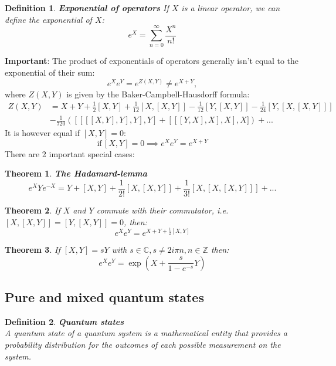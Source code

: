 \documentclass[12pt, a4paper,  nobibnotes]{article}
\newtheorem{theorem}{Theorem}
\newtheorem{definition}{Definition}
\begin{document}
\begin{definition}
    \textbf{Exponential of operators}
    If $X$ is a linear operator, we can define the exponential of $X$:
    \begin{equation*}
        e^X = \sum\limits_{n=0}^\infty \frac{X^n}{n!} 
    \end{equation*}
\end{definition}
\textbf{Important}:
The product of exponentials of operators generally isn't equal to the exponential of their sum:
\begin{equation*}
    e^{X}e^{Y} = e^{Z(X,Y)}\neq e^{X+Y},
\end{equation*}
where $Z(X,Y)$ is given by the Baker-Campbell-Hausdorff formula:
\begin{align*}
    Z(X,Y) &= X + Y + \frac{1}{2}[X,Y] + \frac{1}{12}[X,[X,Y]] - \frac{1}{12}[Y,[X,Y]] -\frac{1}{24}[Y,[X,[X,Y]]] \\
    & - \frac{1}{720}([[[[X,Y],Y],Y],Y] + [[[Y,X],X],X],X]) + ...
\end{align*}
It is however equal if $[X,Y]=0$:
\begin{equation*}
    \textrm{if}\,[X,Y]=0 \implies  e^{X}e^{Y} = e^{X+Y}
\end{equation*}
There are 2 important special cases:
\begin{theorem}
    \textbf{The Hadamard-lemma}
    \begin{equation*}
        e^XYe^{-X} = Y + [X,Y] + \frac{1}{2!}[X,[X,Y]] + \frac{1}{3!}[X,[X,[X,Y]]] + ...
    \end{equation*}
\end{theorem}

\begin{theorem}
    If $X$ and $Y$ commute with their commutator, i.e. $[X, [X,Y]] = [Y, [X,Y]] = 0$, then:
    \begin{equation*}
        e^Xe^Y = e^{X+Y+\frac{1}{2}[X,Y]}
    \end{equation*}
\end{theorem}

\begin{theorem}
    If $[X,Y] = sY$ with $s\in\mathbb{C}, s\neq 2i\pi n, n\in \mathbb Z$ then:
    \begin{equation*}
        e^Xe^Y = \exp\left(X + \frac{s}{1-e^{-s}}Y \right)
    \end{equation*}
\end{theorem}

\subsection{Pure and mixed quantum states}
\begin{definition}
    \textbf{Quantum states}\\
    A quantum state of a quantum system is a mathematical entity that provides a probability distribution 
    for the outcomes of each possible measurement on the system.
\end{definition}
\end{document}
